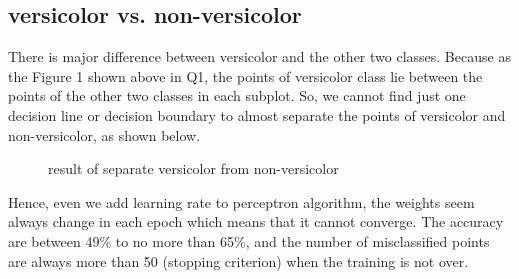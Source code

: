 \documentclass{article}
\begin{document}
\subsection{versicolor vs. non-versicolor}                                                                                                                                                                                                                                                           
There is major difference between versicolor and the other two classes. Because as the Figure 1 shown above in Q1, the points of versicolor class lie between the points of the other two classes in each subplot. So, we cannot find just one decision line or decision boundary to almost separate the points of versicolor and non-versicolor, as shown below.\\
\begin{figure}[H]
\centering
{}
\caption{result of separate versicolor from non-versicolor} \label{fig:1}
\end{figure}
\noindent
Hence, even we add learning rate to perceptron algorithm, the weights seem always change in each epoch which means that it cannot converge. The accuracy are between 49\% to no more than 65\%, and the number of misclassified points are always more than 50 (stopping criterion) when the training is not over.
\end{document}
